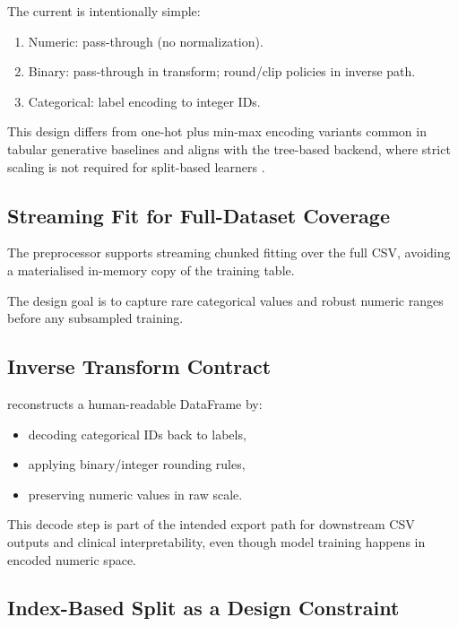 The current  is intentionally simple:
\begin{enumerate}\tightlist
    \item Numeric: pass-through (no normalization).
    \item Binary: pass-through in transform; round/clip policies in inverse path.
    \item Categorical: label encoding to integer IDs.
\end{enumerate}

This design differs from one-hot plus min-max encoding variants common in tabular generative baselines and aligns with the tree-based backend, where strict scaling is not required for split-based learners \cite{chen2016xgboost}.

\subsection{Streaming Fit for Full-Dataset Coverage}

The preprocessor supports streaming chunked fitting over the full CSV, avoiding a materialised in-memory copy of the training table.

The design goal is to capture rare categorical values and robust numeric ranges before any subsampled training.

\subsection{Inverse Transform Contract}

 reconstructs a human-readable DataFrame by:
\begin{itemize}\tightlist
    \item decoding categorical IDs back to labels,
    \item applying binary/integer rounding rules,
    \item preserving numeric values in raw scale.
\end{itemize}

This decode step is part of the intended export path for downstream CSV outputs and clinical interpretability, even though model training happens in encoded numeric space.

\subsection{Index-Based Split as a Design Constraint}

